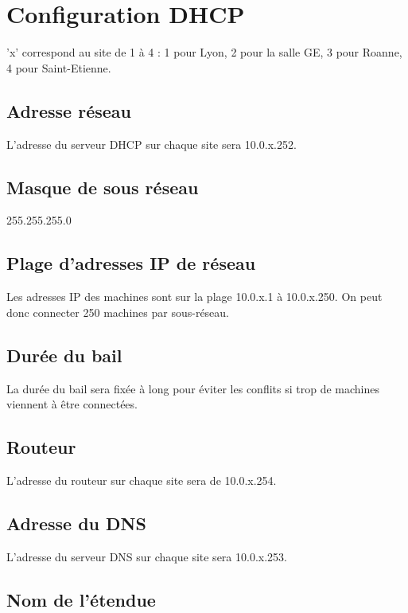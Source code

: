 \section{Configuration DHCP}

'x' correspond au site de 1 à 4 : 1 pour Lyon, 2 pour la salle GE, 3 pour Roanne,
4 pour Saint-Etienne.  


\subsection{Adresse réseau}

L'adresse du serveur DHCP sur chaque site sera 10.0.x.252.

\subsection{Masque de sous réseau}

255.255.255.0

\subsection{Plage d'adresses IP de réseau}

Les adresses IP des machines sont sur la plage 10.0.x.1 à 10.0.x.250.
On peut donc connecter 250 machines par sous-réseau.

\subsection{Durée du bail}

La durée du bail sera fixée à long pour éviter les conflits si trop de machines 
viennent à être connectées.

\subsection{Routeur}

L'adresse du routeur sur chaque site sera de 10.0.x.254.

\subsection{Adresse du DNS}

L'adresse du serveur DNS sur chaque site sera 10.0.x.253.

\subsection{Nom de l'étendue}

